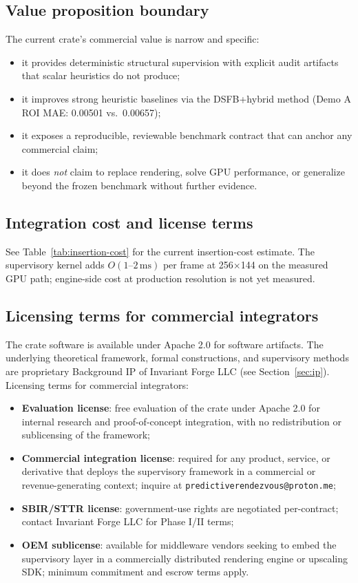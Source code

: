 \documentclass[11pt]{article}
\theoremstyle{definition}
\theoremstyle{plain}
\begin{document}
\subsection{Value proposition boundary}

The current crate's commercial value is narrow and specific:
\begin{itemize}[leftmargin=1.5em]
    \item it provides deterministic structural supervision with explicit audit artifacts that scalar heuristics do not produce;
    \item it improves strong heuristic baselines via the DSFB+hybrid method (Demo A ROI MAE: 0.00501 vs.\ 0.00657);
    \item it exposes a reproducible, reviewable benchmark contract that can anchor any commercial claim;
    \item it does \emph{not} claim to replace rendering, solve GPU performance, or generalize beyond the frozen benchmark without further evidence.
\end{itemize}

\subsection{Integration cost and license terms}

See Table~\ref{tab:insertion-cost} for the current insertion-cost estimate. The supervisory kernel adds $O(1\text{--}2\,\mathrm{ms})$ per frame at 256$\times$144 on the measured GPU path; engine-side cost at production resolution is not yet measured.

\subsection{Licensing terms for commercial integrators}
\label{sec:commercial-licensing}

The crate software is available under Apache 2.0 for software artifacts. The underlying theoretical framework, formal constructions, and supervisory methods are proprietary Background IP of Invariant Forge LLC (see Section~\ref{sec:ip}). Licensing terms for commercial integrators:
\begin{itemize}[leftmargin=1.5em]
    \item \textbf{Evaluation license}: free evaluation of the crate under Apache 2.0 for internal research and proof-of-concept integration, with no redistribution or sublicensing of the framework;
    \item \textbf{Commercial integration license}: required for any product, service, or derivative that deploys the supervisory framework in a commercial or revenue-generating context; inquire at \texttt{predictiverendezvous@proton.me};
    \item \textbf{SBIR/STTR license}: government-use rights are negotiated per-contract; contact Invariant Forge LLC for Phase I/II terms;
    \item \textbf{OEM sublicense}: available for middleware vendors seeking to embed the supervisory layer in a commercially distributed rendering engine or upscaling SDK; minimum commitment and escrow terms apply.
\end{itemize}
\end{document}
